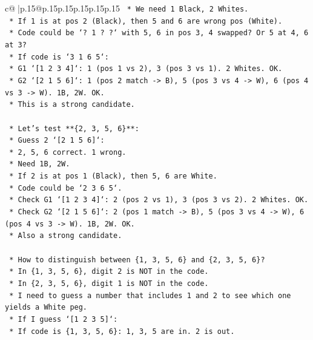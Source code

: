 \documentclass{article}
\begin{document}
{\begin{supertabular}{c@{$\;$}|p{.15\linewidth}@{}p{.15\linewidth}p{.15\linewidth}p{.15\linewidth}p{.15\linewidth}p{.15\linewidth}}
{{{\texttt{            *   We need 1 Black, 2 Whites.} \\
\texttt{            *   If 1 is at pos 2 (Black), then 5 and 6 are wrong pos (White).} \\
\texttt{            *   Code could be `? 1 ? ?` with 5, 6 in pos 3, 4 swapped? Or 5 at 4, 6 at 3?} \\
\texttt{            *   If code is `3 1 6 5`:} \\
\texttt{                *   G1 `{[}1 2 3 4{]}`: 1 (pos 1 vs 2), 3 (pos 3 vs 1). 2 Whites. OK.} \\
\texttt{                *   G2 `{[}2 1 5 6{]}`: 1 (pos 2 match {-}> B), 5 (pos 3 vs 4 {-}> W), 6 (pos 4 vs 3 {-}> W). 1B, 2W. OK.} \\
\texttt{            *   This is a strong candidate.} \\
\\ 
\texttt{    *   Let's test **\{2, 3, 5, 6\}**:} \\
\texttt{        *   Guess 2 `{[}2 1 5 6{]}`:} \\
\texttt{            *   2, 5, 6 correct. 1 wrong.} \\
\texttt{            *   Need 1B, 2W.} \\
\texttt{            *   If 2 is at pos 1 (Black), then 5, 6 are White.} \\
\texttt{            *   Code could be `2 3 6 5`.} \\
\texttt{            *   Check G1 `{[}1 2 3 4{]}`: 2 (pos 2 vs 1), 3 (pos 3 vs 2). 2 Whites. OK.} \\
\texttt{            *   Check G2 `{[}2 1 5 6{]}`: 2 (pos 1 match {-}> B), 5 (pos 3 vs 4 {-}> W), 6 (pos 4 vs 3 {-}> W). 1B, 2W. OK.} \\
\texttt{            *   Also a strong candidate.} \\
\\ 
\texttt{    *   How to distinguish between \{1, 3, 5, 6\} and \{2, 3, 5, 6\}?} \\
\texttt{        *   In \{1, 3, 5, 6\}, digit 2 is NOT in the code.} \\
\texttt{        *   In \{2, 3, 5, 6\}, digit 1 is NOT in the code.} \\
\texttt{        *   I need to guess a number that includes 1 and 2 to see which one yields a White peg.} \\
\texttt{        *   If I guess `{[}1 2 3 5{]}`:} \\
\texttt{            *   If code is \{1, 3, 5, 6\}: 1, 3, 5 are in. 2 is out.} \\
}}}
\end{supertabular}}
\end{document}

